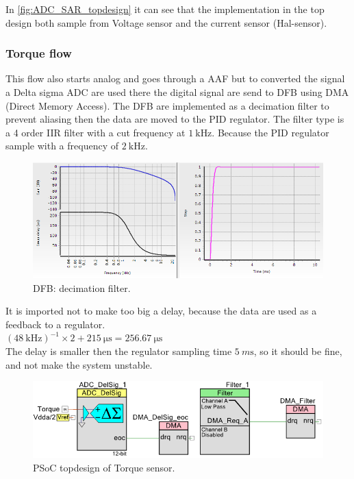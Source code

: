 In \ref{fig:ADC_SAR_topdesign} it can see that the implementation in the top design both sample from Voltage sensor and the current sensor (Hal-sensor). 

\subsubsection{Torque flow}

This flow also starts analog and goes through a AAF but to converted the signal a Delta sigma ADC are used there the digital signal are send to DFB using DMA (Direct Memory Access). The DFB are implemented as a decimation filter to prevent aliasing then the data are moved to the PID regulator. The filter type is a 4 order IIR filter with a cut frequency at $ \SI{1}{\kilo\Hz} $. Because the PID regulator sample with a frequency of $ \SI{2}{\kilo\Hz} $.

\begin{figure}[H]
	\centering
	\includegraphics [width=6in]{Software/Pictures/DFB-decimation.PNG}
	\caption{DFB: decimation filter.}
	\label{fig:ADC_delsig_topdesign}
\end{figure}  

It is imported not to make too big a delay, because the data are used as a feedback to a regulator.\\
$ {(\SI{48}{\kilo\Hz})}^{-1}\times 2 + \SI{215}{\micro\s} = \SI{256.67}{\micro\s} $ \\
The delay is smaller then the regulator sampling time $ \SI{5}{m\s} $, so it should be fine, and not make the system unstable.  

\begin{figure}[H]
	\centering
	\includegraphics [width=6in]{Software/Pictures/ADC_DelSig_topdesign.png}
	\caption{PSoC topdesign of Torque sensor.}
	\label{fig:ADC_delsig_topdesign}
\end{figure}

